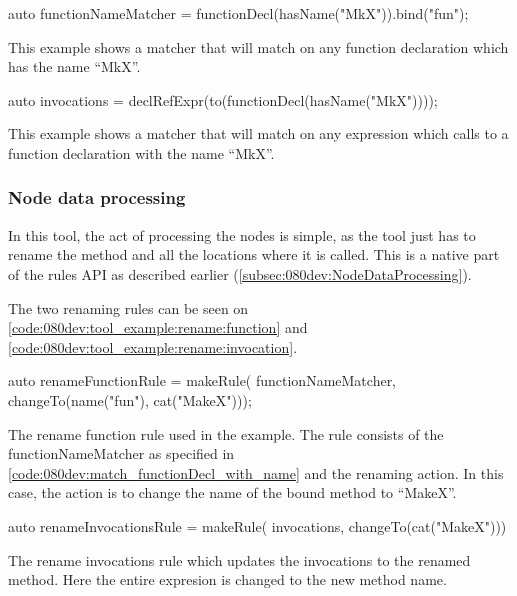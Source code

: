 \begin{listing}[H]
    \begin{cppcode}
auto functionNameMatcher = functionDecl(hasName("MkX")).bind("fun");
    \end{cppcode}
    \caption{This example shows a matcher that will match on any function declaration which has the name ``MkX''.}
    \label{code:080dev:match_functionDecl_with_name}
\end{listing}

\begin{listing}[H]
    \begin{cppcode}
auto invocations = declRefExpr(to(functionDecl(hasName("MkX"))));
    \end{cppcode}
    \caption{This example shows a matcher that will match on any expression which calls to a function declaration with the name ``MkX''.}
    \label{code:080dev:match_expr_call_to_funcDecl_with_name}
\end{listing}

\subsubsection*{Node data processing}

In this tool, the act of processing the nodes is simple, as the tool just has to rename the method and all the locations where it is called. This is a native part of the rules API as described earlier (\cref{subsec:080dev:NodeDataProcessing}). 

The two renaming rules can be seen on \cref{code:080dev:tool_example:rename:function} and \cref{code:080dev:tool_example:rename:invocation}.

\begin{listing}[H]
    \begin{cppcode}
auto renameFunctionRule = makeRule(
        functionNameMatcher,
        changeTo(name("fun"), cat("MakeX")));
    \end{cppcode}
    \caption{The rename function rule used in the example. The rule consists of the functionNameMatcher as specified in \cref{code:080dev:match_functionDecl_with_name} and the renaming action. In this case, the action is to change the name of the bound method to ``MakeX''.}
    \label{code:080dev:tool_example:rename:function}
\end{listing}

\begin{listing}[H]
    \begin{cppcode}
auto renameInvocationsRule = makeRule(
    invocations, changeTo(cat("MakeX")))
    \end{cppcode}
    \caption{The rename invocations rule which updates the invocations to the renamed method. Here the entire expresion is changed to the new method name.}
    \label{code:080dev:tool_example:rename:invocation}
\end{listing}

